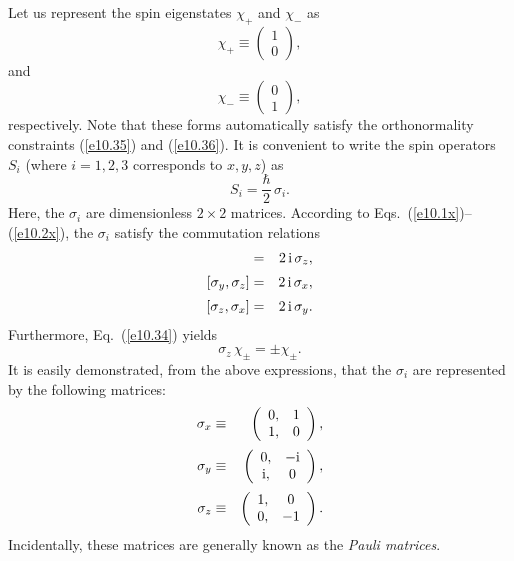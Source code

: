 Let us represent the spin eigenstates $\chi_+$ and $\chi_-$  as
\begin{equation}
\chi_+ \equiv \left(\begin{array}{c}1\\0\end{array}\right),
\end{equation}
and
\begin{equation}
\chi_- \equiv \left(\begin{array}{c}0\\1\end{array}\right),
\end{equation}
respectively. Note that these forms automatically
satisfy the orthonormality constraints (\ref{e10.35}) and (\ref{e10.36}). 
It is convenient to write the spin operators $S_i$ (where $i=1,2,3$ corresponds to
$x,y,z$) as
\begin{equation}\label{e10.46}
S_i = \frac{\hbar}{2}\,\sigma_i.
\end{equation}
Here, the $\sigma_i$ are dimensionless $2\times 2$ matrices. According
to Eqs.~(\ref{e10.1x})--(\ref{e10.2x}), the $\sigma_i$ satisfy the commutation
relations
\begin{eqnarray}
[\sigma_x, \sigma_y]&=& 2\,{\rm i}\,\sigma_z,\\[0.5ex]
[\sigma_y, \sigma_z]&=& 2\,{\rm i}\,\sigma_x,\\[0.5ex]
[\sigma_z,\sigma_x]&=& 2\,{\rm i}\,\sigma_y.
\end{eqnarray}
Furthermore, Eq.~(\ref{e10.34}) yields
\begin{equation}
\sigma_z\,\chi_\pm = \pm \chi_\pm.
\end{equation}
It is easily demonstrated, from the above expressions, that the $\sigma_i$ are represented by the
following matrices:
\begin{eqnarray}
\sigma_x&\equiv&  \left(\begin{array}{cc}0,&1\\
1,& 0\end{array}\right),\\[0.5ex]
\sigma_y&\equiv&  \left(\begin{array}{cc}0,&-{\rm i}\\
{\rm i},& 0\end{array}\right),\\[0.5ex]
\sigma_z&\equiv&  \left(\begin{array}{cc}1,&0\\
0,& -1\end{array}\right).\label{e10.53}
\end{eqnarray}
Incidentally, these matrices are generally known as the {\em Pauli matrices}. 

